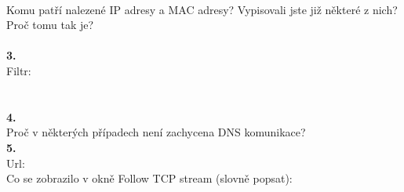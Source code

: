 \vspace{2em}
\\
Komu patří nalezené IP adresy a MAC adresy? Vypisovali jste již některé z nich? Proč tomu tak je?
\\
\vspace{6em} \\
\textbf{3.}\\
Filtr:\\
\\
\vspace{2em} \\
\textbf{4.}\\
\vspace{4em}
Proč v některých případech není zachycena DNS komunikace?\\
\textbf{5.}\\
Url:\\
Co se zobrazilo v okně Follow TCP stream (slovně popsat):\\
